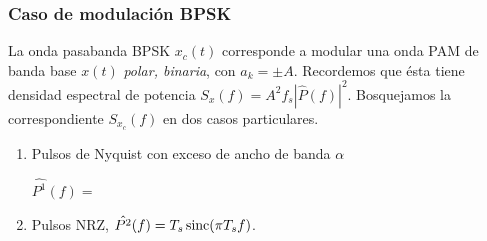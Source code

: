 \subsubsection*{Caso de modulación BPSK}

La onda pasabanda BPSK $x_c(t)$ corresponde a modular una onda PAM de banda base $x(t)$ {\em polar, binaria}, con $a_k=\pm A$. Recordemos que ésta tiene densidad espectral de potencia $S_x(f)= A^2 f_s |\hat{P}(f)|^2$. Bosquejamos la correspondiente $S_{x_c}(f)$ en dos casos particulares.

\begin{minipage}{0.5\textwidth}
\begin{enumerate}
    \item Pulsos de Nyquist con exceso de ancho de banda $\alpha$

    $\hat{P^1}(f) = $\parbox[m]{0.6\textwidth}{}

    \item Pulsos NRZ, $\hat{P^2}(f) = T_s \operatorname{sinc} (\pi T_s f)$.
\end{enumerate}
\end{minipage}\hfil
